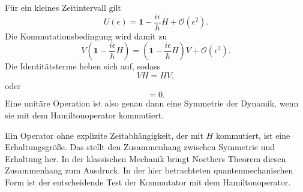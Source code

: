 \begin{classroomqa}
\end{classroomqa}

\begin{classroomqa}
\end{classroomqa}

Für ein kleines Zeitintervall gilt
\begin{equation}
U(\epsilon)
=
\mathbf 1-\frac{i\epsilon}{\hbar}H
+\mathcal O(\epsilon^2).
\end{equation}
Die Kommutationsbedingung wird damit zu
\begin{equation}
V\left(
\mathbf 1-\frac{i\epsilon}{\hbar}H
\right)
=
\left(
\mathbf 1-\frac{i\epsilon}{\hbar}H
\right)V
+\mathcal O(\epsilon^2).
\end{equation}
Die Identitätsterme heben sich auf, sodass
\begin{equation}
VH=HV,
\end{equation}oder
\begin{equation}
[V,H]=0.
\end{equation}
Eine unitäre Operation ist also genau dann eine Symmetrie der Dynamik, wenn sie mit dem Hamiltonoperator kommutiert.

\begin{classroomqa}
\end{classroomqa}

Ein Operator ohne explizite Zeitabhängigkeit, der mit \(H\) kommutiert, ist eine Erhaltungsgröße. Das stellt den Zusammenhang zwischen Symmetrie und Erhaltung her. In der klassischen Mechanik bringt Noethers Theorem diesen Zusammenhang zum Ausdruck. In der hier betrachteten quantenmechanischen Form ist der entscheidende Test der Kommutator mit dem Hamiltonoperator.

